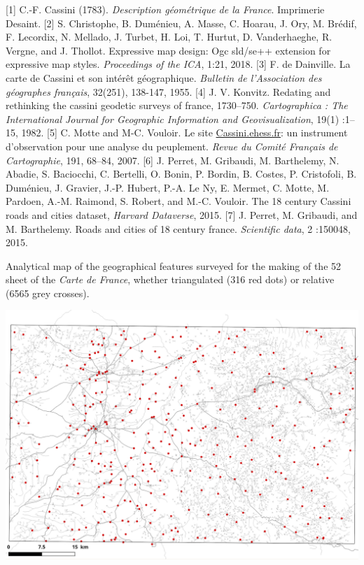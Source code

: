 \documentclass[portrait,a0]{sciposter}
\begin{document}
\begin{minipage}[b]{\textwidth}
\begin{multicols}{3}
    \vfill
    \small
    [1] C.-F. Cassini (1783). \textit{Description géométrique de la France}. Imprimerie Desaint.
    [2] S. Christophe, B. Duménieu, A. Masse, C. Hoarau, J. Ory, M. Brédif, F. Lecordix, N. Mellado, J. Turbet, H. Loi, T. Hurtut, D. Vanderhaeghe, R. Vergne, and J. Thollot. Expressive map design: Ogc sld/se++ extension for expressive map styles. \textit{Proceedings of the ICA}, 1:21, 2018.
    [3] F. de Dainville. La carte de Cassini et son intérêt géographique. \textit{Bulletin de l'Association des géographes français}, 32(251), 138-147, 1955.
    [4] J. V. Konvitz. Redating and rethinking the cassini geodetic surveys of france, 1730–750. \textit{Cartographica : The International Journal for Geographic Information and Geovisualization}, 19(1) :1–15, 1982.
    [5] C. Motte and M-C. Vouloir. Le site \href{http://cassini.ehess.fr}{Cassini.ehess.fr}: un instrument d’observation pour une analyse du peuplement. \textit{Revue du Comité Français de Cartographie}, 191, 68–84, 2007.
    [6] J. Perret, M. Gribaudi, M. Barthelemy, N. Abadie, S. Baciocchi, C. Bertelli, O. Bonin, P. Bordin, B. Costes, P. Cristofoli, B. Duménieu, J. Gravier, J.-P. Hubert, P.-A. Le Ny, E. Mermet, C. Motte, M. Pardoen, A.-M. Raimond, S. Robert, and M.-C. Vouloir. The 18 century Cassini roads and cities dataset, \textit{Harvard Dataverse}, 2015.
    [7] J. Perret, M. Gribaudi, and M. Barthelemy. Roads and cities of 18 century france. \textit{Scientific data}, 2 :150048, 2015.
    \begin{center}
      \captionsetup{type=figure}
      \caption{Analytical map of the geographical features surveyed for the making of the 52 sheet of the \textit{Carte de France}, whether triangulated (316 red dots) or relative (\num{6565} grey crosses).}
      \label{map:triangulated-relative}
      \vspace{-0.5cm}\includegraphics[width=0.9\linewidth,trim= 0cm 0cm 0cm 2cm, clip]{gfx/Triangulated.png}
    \end{center}
  \end{multicols}
\end{minipage}
\end{document}
